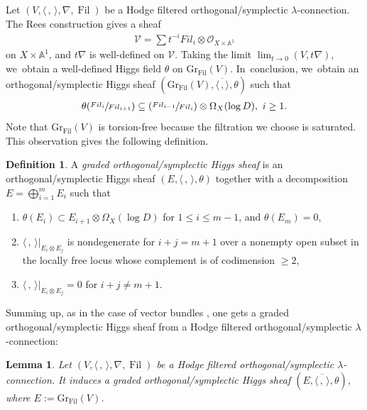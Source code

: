 \documentclass[11pt]{article}
\numberwithin{equation}{section}
\newcommand{\Fil}{\textit{Fil}}
\newcommand{\Psfrac}[2]{(\sfrac{#1}{#2})}
\newcommand{\lconnection}{$\lambda$\nobreakdash-con\-nec\-tion\xspace}
\DeclareMathOperator{\Filt}{Fil}
\newcommand{\Gr}{\mathrm{Gr}}
\theoremstyle{plain}
\newtheorem{lem}[thm]{Lemma}
\theoremstyle{definition}
\newtheorem{defn}[thm]{Definition}
\begin{document}
Let $(V, \langle \,, \, \rangle,\nabla, \Filt)$ be a Hodge filtered orthogonal/symplectic \lconnection. The Rees construction gives a sheaf\vspace*{-3pt}
\begin{align*}
\mathcal{V}= \sum t^{-i} \Fil_{i} \otimes \mathcal{O}_{X \times \mathbb{A}^1}
\end{align*}
on $X \times \mathbb{A}^1$, and $t \nabla$ is well-defined on $\mathcal{V}$. Taking the limit $\lim_{t \to 0} (V,t\nabla)$, we~obtain a well-defined Higgs field $\theta$ on $\Gr_{\Filt}(V)$. In~conclusion, we~obtain an orthogonal/symplectic Higgs sheaf $(\Gr_{\Filt}(V), \overline{\langle \,, \rangle}, \theta)$ such that
\begin{align*}
\theta( \sfrac{\Fil_i}{\Fil_{i+1}} ) \subseteq \Psfrac{\Fil_{i-1}}{\Fil_{i}} \otimes \Omega_X(\log D), \ i \geq 1.
\end{align*}
Note that $\Gr_{\Filt}(V)$ is torsion-free because the filtration we choose is saturated. This observation gives the following definition.

\begin{defn}
A \emph{graded orthogonal/symplectic Higgs sheaf} is an orthogonal/symplectic Higgs sheaf $(E, \langle \,, \, \rangle,\theta)$ together with a decomposition $E=\mathop{\bigoplus}_{i=1}^{m} E_i$ such that
\begin{enumerate}
\item $\theta(E_i)\subset E_{i+1}\otimes \Omega_X(\log D)$ for $ 1\leq i\leq m-1$, and $\theta(E_m)=0$,

\item $\langle \,, \, \rangle|_{E_i\otimes E_j}$ is nondegenerate for $i+j=m+1$ over a nonempty open subset in the locally free locus whose complement is of codimension $\geq 2$,

\item $\langle \,, \, \rangle|_{E_i\otimes E_j}=0$ for $i+j\neq m+1$.
\end{enumerate}
\end{defn}

Summing up, as in the case of vector bundles \cite{S10}, one gets a graded orthogonal/symplectic Higgs sheaf from a Hodge filtered orthogonal/symplectic \lconnection:

\begin{lem}
Let $(V, \langle \,, \, \rangle,\nabla, \Filt)$ be a Hodge filtered orthogonal/symplectic \lconnection. It induces a graded orthogonal/symplectic Higgs sheaf $(E,\overline{\langle \,, \, \rangle},\theta)$, where $E:=\Gr_{\Filt}(V)$.
\end{lem}
\end{document}
